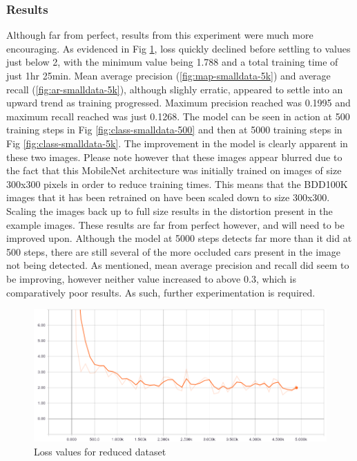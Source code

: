 \documentclass[12pt]{report}
\begin{document}
\subsubsection*{Results}
\begin{flushleft}
Although far from perfect, results from this experiment were much more encouraging. As evidenced in Fig \ref{fig:loss-smalldata-5k}, loss quickly declined before settling to values just below 2, with the minimum value being 1.788 and a total training time of just 1hr 25min. Mean average precision (\ref{fig:map-smalldata-5k}) and average recall (\ref{fig:ar-smalldata-5k}), although slighly erratic, appeared to settle into an upward trend as training progressed. Maximum precision reached was 0.1995 and maximum recall reached was just 0.1268. The model can be seen in action at 500 training steps in Fig \ref{fig:class-smalldata-500} and then at 5000 training steps in Fig \ref{fig:class-smalldata-5k}. The improvement in the model is clearly apparent in these two images. Please note however that these images appear blurred due to the fact that this MobileNet architecture was initially trained on images of size 300x300 pixels in order to reduce training times. This means that the BDD100K images that it has been retrained on have been scaled down to size 300x300. Scaling the images back up to full size results in the distortion present in the example images. These results are far from perfect however, and will need to be improved upon. Although the model at 5000 steps detects far more than it did at 500 steps, there are still several of the more occluded cars present in the image not being detected. As mentioned, mean average precision and recall did seem to be improving, however neither value increased to above 0.3, which is comparatively poor results. As such, further experimentation is required.
\end{flushleft}

\vspace{0.5cm}
\begin{figure}[ht!]
	\centering
	\includegraphics[width=12cm]{loss-smalldata-5k}
	\caption{Loss values for reduced dataset}
	\label{fig:loss-smalldata-5k}
\end{figure}
\end{document}
